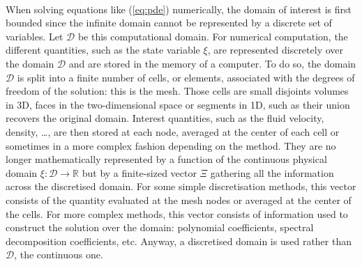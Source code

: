     \paragraph{}
    When solving equations like (\ref{eq:pde}) numerically, the domain of interest is first bounded since the infinite domain cannot be represented by a discrete set of variables.
    Let $\mathcal{D}$ be this computational domain.
    For numerical computation, the different quantities, such as the state variable $\xi$, are represented discretely over the domain $\mathcal{D}$ and are stored in the memory of a computer.
    To do so, the domain $\mathcal{D}$ is split into a finite number of cells, or elements, associated with the degrees of freedom of the solution: this is the mesh.
    Those cells are small disjoints volumes in 3D, faces in the two-dimensional space or segments in 1D, such as their union recovers the original domain.
    Interest quantities, such as the fluid velocity, density, \dots, are then stored at each node, averaged at the center of each cell or sometimes in a more complex fashion depending on the method.
    They are no longer mathematically represented by a function of the continuous physical domain $\xi: \mathcal{D} \rightarrow \mathbb{R}$ but by a finite-sized vector $\Xi$ gathering all the information across the discretised domain.
    For some simple discretisation methods, this vector consists of the quantity evaluated at the mesh nodes or averaged at the center of the cells.
    For more complex methods, this vector consists of information used to construct the solution over the domain: polynomial coefficients, spectral decomposition coefficients, etc.
    Anyway, a discretised domain is used rather than $\mathcal{D}$, the continuous one.

